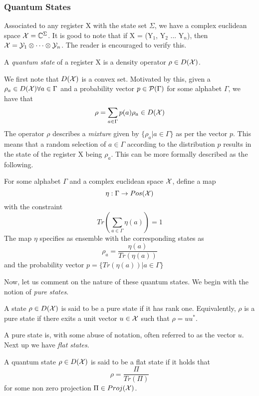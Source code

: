 \subsubsection{Quantum States}
Associated to any register \textsf{X} with the state set $\Sigma$, we have a complex euclidean space $\X = \C^{\Sigma}$. It is good to note that if \textsf{X} = (\textsf{Y}$_1$, \textsf{Y}$_2$ ... \textsf{Y}$_n$), then $\X = \Y_1\otimes\dots\otimes\Y_n$. The reader is encouraged to verify this.
\begin{definition}
A \textit{quantum state} of a register \textsf{X} is a density operator $\rho\in D(\X)$.
\end{definition}
\noindent We first note that $D(\X)$ is a convex set. Motivated by this, given a $\rho_a\in D(\X)\forall a\in\Gamma$ and a probability vector $p\in\P(\Gamma)$ for some alphabet $\Gamma$, we have that
\[\rho = \sum_{a\in\Gamma}p(a)\rho_a \in D(\X)\]
The operator $\rho$ describes a \textit{mixture} given by $\{\rho_a|a\in\Gamma\}$ as per the vector $p$. This means that a random selection of $a\in\Gamma$ according to the distribution $p$ results in the state of the register \textsf{X} being $\rho_a$. This can be more formally described as the following.
\begin{definition}
For some alphabet $\Gamma$ and a complex euclidean space $\X$, define a map
\[\eta:\Gamma\to Pos(\X)\]
with the constraint 
\[Tr(\sum_{a\in\Gamma}\eta(a)) = 1\]
The map $\eta$ specifies as ensemble with the corresponding states as
\[\rho_a = \frac{\eta(a)}{Tr(\eta(a))}\] and the probability vector $p = \{Tr(\eta(a))|a\in\Gamma\}$

\end{definition}
\noindent 
Now, let us comment on the nature of these quantum states. We begin with the notion of \textit{pure states}.
\begin{definition}
A state $\rho\in D(\X)$ is said to be a pure state if it has rank one.
Equivalently, $\rho$ is a pure state if there exits a unit vector $u\in\X$ such that $\rho = uu^*$.
\end{definition}
A pure state is, with some abuse of notation, often referred to as the vector $u$. Next up we have \textit{flat states}.
\begin{definition}
A quantum state $\rho\in D(\X)$ is said to be a flat state if it holds that \[\rho = \frac{\Pi}{Tr(\Pi)}\] for some non zero projection $\Pi \in Proj(\X)$.
\end{definition}
